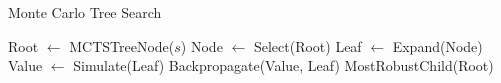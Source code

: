 
\begin{algorithm}[H]
    \caption{Monte Carlo Tree Search}
    \label{alg:mcts}
    \begin{algorithmic}[1]
    
        \State Root $\gets$ MCTSTreeNode($s$)
            \State Node $\gets$ Select(Root)
            \State Leaf $\gets$ Expand(Node)
            \State Value $\gets$ Simulate(Leaf)
            \State Backpropagate(Value, Leaf)
        \EndWhile
        \State \Return MostRobustChild(Root)
    \EndProcedure
    \end{algorithmic}
\end{algorithm}
